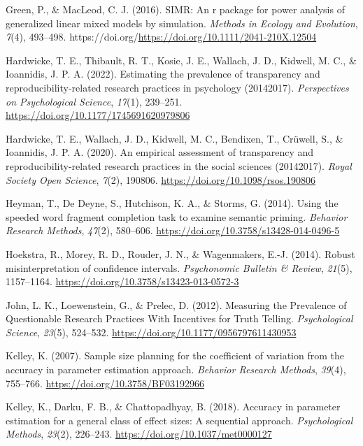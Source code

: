 \documentclass[
  man]{apa7}
\newlength{\cslhangindent}
\newenvironment{CSLReferences}[2] %
 {\begin{list}{}{%
  \setlength{\itemindent}{0pt}
  \setlength{\leftmargin}{0pt}
  \setlength{\parsep}{0pt}
  \ifodd #1
   \setlength{\leftmargin}{\cslhangindent}
   \setlength{\itemindent}{-1\cslhangindent}
  \fi
  \setlength{\itemsep}{#2\baselineskip}}}
 {\end{list}}
\begin{document}
\begin{CSLReferences}{1}{0}
Green, P., \& MacLeod, C. J. (2016). SIMR: An r package for power analysis of generalized linear mixed models by simulation. \emph{Methods in Ecology and Evolution}, \emph{7}(4), 493--498. https://doi.org/\url{https://doi.org/10.1111/2041-210X.12504}

Hardwicke, T. E., Thibault, R. T., Kosie, J. E., Wallach, J. D., Kidwell, M. C., \& Ioannidis, J. P. A. (2022). Estimating the prevalence of transparency and reproducibility-related research practices in psychology (2014{\textendash}2017). \emph{Perspectives on Psychological Science}, \emph{17}(1), 239--251. \url{https://doi.org/10.1177/1745691620979806}

Hardwicke, T. E., Wallach, J. D., Kidwell, M. C., Bendixen, T., Crüwell, S., \& Ioannidis, J. P. A. (2020). An empirical assessment of transparency and reproducibility-related research practices in the social sciences (2014{\textendash}2017). \emph{Royal Society Open Science}, \emph{7}(2), 190806. \url{https://doi.org/10.1098/rsos.190806}

Heyman, T., De Deyne, S., Hutchison, K. A., \& Storms, G. (2014). Using the speeded word fragment completion task to examine semantic priming. \emph{Behavior Research Methods}, \emph{47}(2), 580--606. \url{https://doi.org/10.3758/s13428-014-0496-5}

Hoekstra, R., Morey, R. D., Rouder, J. N., \& Wagenmakers, E.-J. (2014). Robust misinterpretation of confidence intervals. \emph{Psychonomic Bulletin \& Review}, \emph{21}(5), 1157--1164. \url{https://doi.org/10.3758/s13423-013-0572-3}

John, L. K., Loewenstein, G., \& Prelec, D. (2012). Measuring the Prevalence of Questionable Research Practices With Incentives for Truth Telling. \emph{Psychological Science}, \emph{23}(5), 524--532. \url{https://doi.org/10.1177/0956797611430953}

Kelley, K. (2007). Sample size planning for the coefficient of variation from the accuracy in parameter estimation approach. \emph{Behavior Research Methods}, \emph{39}(4), 755--766. \url{https://doi.org/10.3758/BF03192966}

Kelley, K., Darku, F. B., \& Chattopadhyay, B. (2018). Accuracy in parameter estimation for a general class of effect sizes: A sequential approach. \emph{Psychological Methods}, \emph{23}(2), 226--243. \url{https://doi.org/10.1037/met0000127}


\end{CSLReferences}
\end{document}
